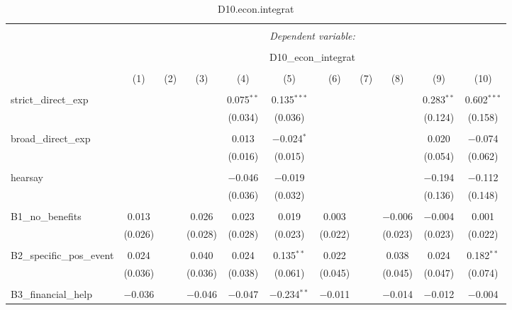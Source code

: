 
\begin{table}[H] \centering 
  \caption{D10.econ.integrat} 
  \label{} 
\tiny 
\begin{tabular}{@{\extracolsep{4pt}}lcccccccccc} 
\\[-1.8ex]\hline 
\hline \\[-1.8ex] 
 & \multicolumn{10}{c}{\textit{Dependent variable:}} \\ 
\cline{2-11} 
\\[-1.8ex] & \multicolumn{10}{c}{D10\_econ\_integrat} \\ 
\\[-1.8ex] & (1) & (2) & (3) & (4) & (5) & (6) & (7) & (8) & (9) & (10)\\ 
\hline \\[-1.8ex] 
 strict\_direct\_exp &  &  &  & 0.075$^{**}$ & 0.135$^{***}$ &  &  &  & 0.283$^{**}$ & 0.602$^{***}$ \\ 
  &  &  &  & (0.034) & (0.036) &  &  &  & (0.124) & (0.158) \\ 
  & & & & & & & & & & \\ 
 broad\_direct\_exp &  &  &  & 0.013 & $-$0.024$^{*}$ &  &  &  & 0.020 & $-$0.074 \\ 
  &  &  &  & (0.016) & (0.015) &  &  &  & (0.054) & (0.062) \\ 
  & & & & & & & & & & \\ 
 hearsay &  &  &  & $-$0.046 & $-$0.019 &  &  &  & $-$0.194 & $-$0.112 \\ 
  &  &  &  & (0.036) & (0.032) &  &  &  & (0.136) & (0.148) \\ 
  & & & & & & & & & & \\ 
 B1\_no\_benefits & 0.013 &  & 0.026 & 0.023 & 0.019 & 0.003 &  & $-$0.006 & $-$0.004 & 0.001 \\ 
  & (0.026) &  & (0.028) & (0.028) & (0.023) & (0.022) &  & (0.023) & (0.023) & (0.022) \\ 
  & & & & & & & & & & \\ 
 B2\_specific\_pos\_event & 0.024 &  & 0.040 & 0.024 & 0.135$^{**}$ & 0.022 &  & 0.038 & 0.024 & 0.182$^{**}$ \\ 
  & (0.036) &  & (0.036) & (0.038) & (0.061) & (0.045) &  & (0.045) & (0.047) & (0.074) \\ 
  & & & & & & & & & & \\ 
 B3\_financial\_help & $-$0.036 &  & $-$0.046 & $-$0.047 & $-$0.234$^{**}$ & $-$0.011 &  & $-$0.014 & $-$0.012 & $-$0.004 \\ 

\end{tabular}
\end{table}
